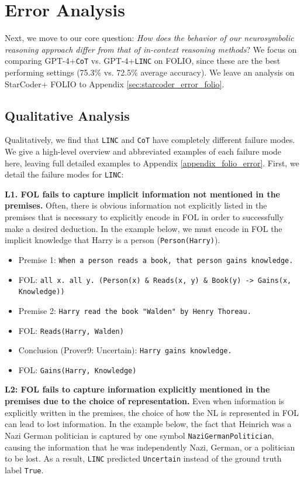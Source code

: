 \documentclass[11pt]{article}
\begin{document}
\section{Error Analysis}
\label{sec:error_analysis}
Next, we move to our core question: \textit{How does the behavior of our neurosymbolic reasoning approach differ from that of in-context reasoning methods}?
We focus on comparing GPT-4+\texttt{CoT} vs. GPT-4+\texttt{LINC} on FOLIO, since these are the best performing settings (75.3\% vs. 72.5\% average accuracy). We leave an analysis on StarCoder+ FOLIO to Appendix \ref{sec:starcoder_error_folio}.

\subsection{Qualitative Analysis} \label{sec:error_qualitative}
Qualitatively, we find that \texttt{LINC} and \texttt{CoT} have completely different failure modes. We give a high-level overview and abbreviated examples of each failure mode here, leaving full detailed examples to Appendix \ref{appendix_folio_error}. First, we detail the failure modes for \texttt{LINC}:

\textbf{L1. FOL fails to capture implicit information not mentioned in the premises.} Often, there is obvious information not explicitly listed in the premises that is necessary to explicitly encode in FOL in order to successfully make a desired deduction. In the example below, we must encode in FOL the implicit knowledge that Harry is a person (\texttt{Person(Harry)}).

\begin{itemize}
\itemsep0.1em
    \item[] \small Premise 1: \texttt{When a person reads a book, that person gains knowledge.}
    \item[] \small FOL: \texttt{all x. all y. (Person(x) \& Reads(x, y) \& Book(y) -> Gains(x, Knowledge))}
    \item[] \small Premise 2: \texttt{Harry read the book "Walden" by Henry Thoreau.}
    \item[] \small FOL: \texttt{Reads(Harry, Walden)}
    \item[] \small Conclusion (Prover9: Uncertain): \texttt{Harry gains knowledge.}
    \item[] \small FOL: \texttt{Gains(Harry, Knowledge)}
\end{itemize}


\textbf{L2: FOL fails to capture information explicitly mentioned in the premises due to the choice of representation.} Even when information is explicitly written in the premises, the choice of how the NL is represented in FOL can lead to lost information. In the example below, the fact that Heinrich was a Nazi German politician is captured by one symbol \texttt{NaziGermanPolitician}, causing the information that he was independently Nazi, German, or a politician to be lost.
As a result, \texttt{LINC} predicted \texttt{Uncertain} instead of the ground truth label \texttt{True}.
\end{document}

